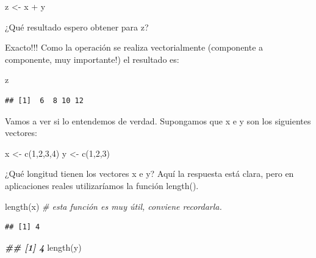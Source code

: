 \documentclass[
]{book}
\newenvironment{Shaded}{\begin{snugshade}}{\end{snugshade}}
\newcommand{\CommentTok}[1]{\textcolor[rgb]{0.56,0.35,0.01}{\textit{#1}}}
\newcommand{\DecValTok}[1]{\textcolor[rgb]{0.00,0.00,0.81}{#1}}
\newcommand{\DocumentationTok}[1]{\textcolor[rgb]{0.56,0.35,0.01}{\textbf{\textit{#1}}}}
\newcommand{\FunctionTok}[1]{\textcolor[rgb]{0.00,0.00,0.00}{#1}}
\newcommand{\NormalTok}[1]{#1}
\newcommand{\OtherTok}[1]{\textcolor[rgb]{0.56,0.35,0.01}{#1}}
\newcommand{\SpecialCharTok}[1]{\textcolor[rgb]{0.00,0.00,0.00}{#1}}
\begin{document}
\begin{Shaded}
\begin{Highlighting}[]
\NormalTok{z }\OtherTok{\textless{}{-}}\NormalTok{ x }\SpecialCharTok{+}\NormalTok{ y}
\end{Highlighting}
\end{Shaded}

¿Qué resultado espero obtener para z?

Exacto!!! Como la operación se realiza vectorialmente (componente a componente, muy importante!) el resultado es:

\begin{Shaded}
\begin{Highlighting}[]
\NormalTok{z}
\end{Highlighting}
\end{Shaded}

\begin{verbatim}
## [1]  6  8 10 12
\end{verbatim}

Vamos a ver si lo entendemos de verdad. Supongamos que x e y son los siguientes vectores:

\begin{Shaded}
\begin{Highlighting}[]
\NormalTok{x }\OtherTok{\textless{}{-}} \FunctionTok{c}\NormalTok{(}\DecValTok{1}\NormalTok{,}\DecValTok{2}\NormalTok{,}\DecValTok{3}\NormalTok{,}\DecValTok{4}\NormalTok{)}
\NormalTok{y }\OtherTok{\textless{}{-}} \FunctionTok{c}\NormalTok{(}\DecValTok{1}\NormalTok{,}\DecValTok{2}\NormalTok{,}\DecValTok{3}\NormalTok{)}
\end{Highlighting}
\end{Shaded}

¿Qué longitud tienen los vectores x e y? Aquí la respuesta está clara, pero en aplicaciones reales utilizaríamos la función length().

\begin{Shaded}
\begin{Highlighting}[]
\FunctionTok{length}\NormalTok{(x)                }\CommentTok{\# esta función es muy útil, conviene recordarla.}
\end{Highlighting}
\end{Shaded}

\begin{verbatim}
## [1] 4
\end{verbatim}

\begin{Shaded}
\begin{Highlighting}[]
\DocumentationTok{\#\# [1] 4}
\FunctionTok{length}\NormalTok{(y)}
\end{Highlighting}
\end{Shaded}
\end{document}
